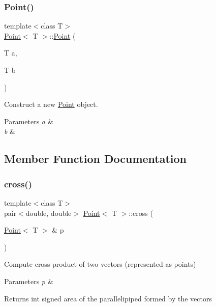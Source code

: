 \subsubsection{\texorpdfstring{Point()}{Point()}\hspace{0.1cm}{\footnotesize\ttfamily [2/2]}}
{\footnotesize\ttfamily template$<$class T$>$ \\
\mbox{\hyperlink{classPoint}{Point}}$<$ T $>$\+::\mbox{\hyperlink{classPoint}{Point}} (\begin{DoxyParamCaption}\item[{T}]{a,  }\item[{T}]{b }\end{DoxyParamCaption})\hspace{0.3cm}{\ttfamily [inline]}}



Construct a new \mbox{\hyperlink{classPoint}{Point}} object. 


\begin{DoxyParams}{Parameters}
{\em a} & \\
\hline
{\em b} & \\
\hline
\end{DoxyParams}


\subsection{Member Function Documentation}
\mbox{\label{classPoint_a79b5e5f4d1e341cacfc6a5fa84eb80ee}} 
\subsubsection{\texorpdfstring{cross()}{cross()}}
{\footnotesize\ttfamily template$<$class T$>$ \\
pair$<$double, double$>$ \mbox{\hyperlink{classPoint}{Point}}$<$ T $>$\+::cross (\begin{DoxyParamCaption}\item[{\mbox{\hyperlink{classPoint}{Point}}$<$ T $>$ \&}]{p }\end{DoxyParamCaption})\hspace{0.3cm}{\ttfamily [inline]}}



Compute cross product of two vectors (represented as points) 


\begin{DoxyParams}{Parameters}
{\em p} & \\
\hline
\end{DoxyParams}
\begin{DoxyReturn}{Returns}
int signed area of the parallelipiped formed by the vectors 
\end{DoxyReturn}
\mbox{\label{classPoint_a7e220ceafc554dbb07185138eb3f4c20}} 
